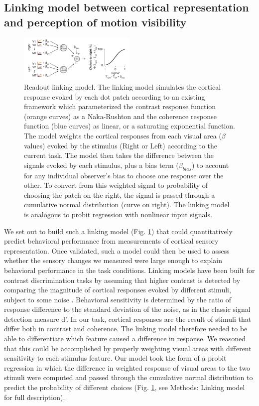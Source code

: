 \subsection{Linking model between cortical representation and perception of motion visibility}

\begin{figure}
\centering
\includegraphics[keepaspectratio,width=0.5\textwidth]{figs_c3/Fig4_linkingmodel.pdf}
\caption[Readout linking model]{Readout linking model. The linking model simulates the cortical response evoked by each dot patch according to an existing framework \citep{Birman2018-sp} which parameterized the contrast response function (orange curves) as a Naka-Rushton and the coherence response function (blue curves) as linear, or a saturating exponential function. The model weights the cortical responses from each visual area ($\beta$ values) evoked by the stimulus (Right or Left) according to the current task. The model then takes the difference between the signals evoked by each stimulus, plus a bias term ($\beta_{bias}$) to account for any individual observer’s bias to choose one response over the other. To convert from this weighted signal to probability of choosing the patch on the right, the signal is passed through a cumulative normal distribution (curve on right). The linking model is analogous to probit regression with nonlinear input signals.}
\label{fig:c3f4}
\end{figure}

We set out to build such a linking model (Fig. \ref{fig:c3f4}) that could quantitatively predict behavioral performance from measurements of cortical sensory representation. Once validated, such a model could then be used to assess whether the sensory changes we measured were large enough to explain behavioral performance in the task conditions. Linking models have been built for contrast discrimination tasks by assuming that higher contrast is detected by comparing the magnitude of cortical responses evoked by different stimuli, subject to some noise \citep{Boynton1999-jd,Foley1981-aw,Gardner2015-bd,Ling2006-zx,Nachmias1974-vz,Pestilli2009-xu}. Behavioral sensitivity is determined by the ratio of response difference to the standard deviation of the noise, as in the classic signal detection measure d’. In our task, cortical responses are the result of stimuli that differ both in contrast and coherence. The linking model therefore needed to be able to differentiate which feature caused a difference in response. We reasoned that this could be accomplished by properly weighting visual areas with different sensitivity to each stimulus feature. Our model took the form of a probit regression \citep{Bliss1934-em} in which the difference in weighted response of visual areas to the two stimuli were computed and passed through the cumulative normal distribution to predict the probability of different choices (Fig. \ref{fig:c3f4}, see Methods: Linking model for full description).


